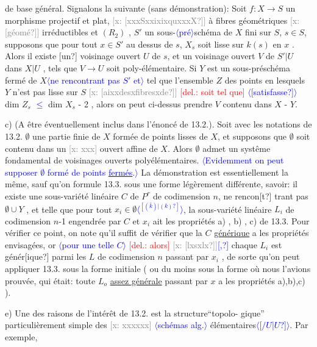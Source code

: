 \documentclass[11pt]{article}
\newcommand{\mspage}[1]{{\small\sffamily[p.\,#1]}}
\newcommand{\hand}[1]{\textcolor{blue}{#1}}
\newcommand{\inserted}[2][]{\textcolor{blue}{$\langle$#2$\rangle$}}
\newcommand{\deleted}[1]{\textcolor{red}{[\textsf{del.:} #1]}}
\newcommand{\xout}[1]{\textcolor{gray}{[\textsf{x:} #1]}}
\newcommand{\uline}[1]{\underline{#1}}
\newcommand{\unsure}[1]{[#1?]}
\begin{document}
de base général. Signalons la suivante (sans démonstration): Soit $f:X\to S$
un morphisme projectif et plat, \xout{\unsure{xxxSxxixixquxxxX}} à fibres géométriques
\xout{\unsure{géomé}} irréductibles et $(R_2)$ , $S'$ un sous-\inserted[typed]{pré}schéma de $X$ fini sur $S$,
$s\in S$, supposons que pour tout $x\in S'$ au dessus de $s$, $X_s$ soit lisse sur
$k(s)$ en $x$ . Alors il existe \unsure{un} voisinage ouvert $U$ de $s$, et un voisinage
ouvert $V$ de $S'|U$ dans $X|U$ , tels que $V\longrightarrow U$ soit poly-élémentaire.
Si $Y$ est un sous-préschéma fermé de $X$\inserted[typed]{ne rencontrant pas $S'$ et} tel que l'ensemble $Z$ des points
en lesquels $Y$ n'est pas lisse sur $S$ \xout{\unsure{aixxdesxfibresxde}} \deleted{soit tel que} \inserted{\unsure{satisfasse}}
dim $Z_s$ \hand{$\leq$} dim $X_s$ - 2 , alors on peut ci-dessus prendre $V$ contenu dans
$X$ - $Y$.

c) (A être éventuellement inclus dans l'énoncé de 13.2.). Soit
avec les notations de 13.2. $\emptyset$ une partie finie de $X$ formée de points
lisses de $X$, et supposons que $\emptyset$ soit contenu dans un \xout{xxx} ouvert affine
de $X$. Alors $\emptyset$ admet un systême fondamental de voisinages ouverts
polyélémentaires. \inserted[typed]{Evidemment on peut supposer $\emptyset$ formé de points \uline{fermés}.} La démonstration est essentiellement la même, sauf
qu'on formule 13.3. sous une forme légèrement différente, savoir: il
existe une sous-variété linéaire $C$ de $P^r$ de codimension $n$, ne rencon\unsure{t}%
trant pas $\emptyset\cup Y$ , et telle que pour tout $x_i\in\emptyset$\inserted{$^{\unsure{(\bar{k})|(k)}}$}, la sous-variété
linéaire $L_i$ de codimension $n$-1 engendrée par $C$ et $x_i$ ait les propriétés
a) , b) , c) de 13.3. Pour vérifier ce point, on note qu'il suffit de
vérifier que la $C$ \uline{générique} a les propriétés envisagées, or \inserted{pour une telle $C$} \deleted{alors}
\xout{\unsure{lxsxlx}}\hand{\unsure{,}} chaque $L_i$ est génér\unsure{ique} parmi les $L$ de codimension $n$ passant
par $x_i$ , de sorte qu'on peut appliquer 13.3. sous la forme initiale
( ou du moins sous la forme où nous l'avions prouvée, qui était: toute
$L_o$ \uline{assez générale} passant par $x$ a les propriétés a),b),c) ).

e) Une des raisons de l'intérêt de 13.2. est la structure``topolo-%
gique'' particulièrement simple des \xout{xxxxxx} \inserted[typed]{schémas alg.} élémentaires\inserted{\unsure{$/U$|$U$}}. Par exemple,

\mspage{\hand{82}}
\end{document}
